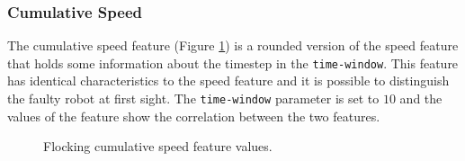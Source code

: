 \documentclass[../../Thesis.tex]{subfiles}
\begin{document}
			\subsubsection{Cumulative Speed}
				The cumulative speed feature (Figure \ref{fig:flocking_cumulative_speed}) is a rounded version of the speed feature that holds some information about the timestep in the \verb|time-window|. This feature has identical characteristics to the speed feature and it is possible to distinguish the faulty robot at first sight. The \verb|time-window| parameter is set to $10$ and the values of the feature show the correlation between the two features.
				\begin{figure}
					\centering
					\quad
					\caption{Flocking cumulative speed feature values.}
					\label{fig:flocking_cumulative_speed}
				\end{figure}
			
\end{document}
